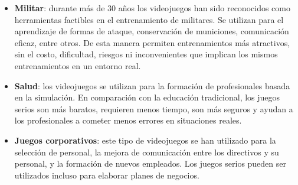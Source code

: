 \begin{itemize}

\item \textbf{Militar}: durante más de $30$ años los videojuegos han sido
    reconocidos como herramientas factibles en el entrenamiento de militares. Se
    utilizan para el aprendizaje de formas de ataque, conservación de
    municiones, comunicación eficaz, entre otros.  De esta manera permiten
    entrenamientos más atractivos, sin el costo, dificultad, riesgos ni
    inconvenientes que implican los mismos entrenamientos en un entorno
    real\cite{education:games}.

\item \textbf{Salud}: los videojuegos se utilizan para la formación de
    profesionales basada en la simulación. En comparación con la educación
    tradicional, los juegos serios son más baratos, requieren menos tiempo, son
    más seguros y ayudan a los profesionales a cometer menos errores en
    situaciones reales\cite{education:games}. 

\item \textbf{Juegos corporativos}: este tipo de videojuegos se han utilizado
    para la selección de personal, la mejora de comunicación entre los
    directivos y su personal, y la formación de nuevos empleados. Los juegos
    serios pueden ser utilizados incluso para elaborar planes de
    negocios\cite{education:games}. 

\end{itemize}

